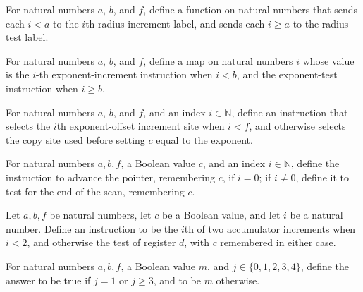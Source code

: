 \begin{definition}
\label{Complexity.PathHard.sSinc}
\leanok
{}
For natural numbers $a$, $b$, and $f$, define a function on natural numbers that sends
each $i<a$ to the $i$th radius-increment label, and sends each $i\ge a$ to the
radius-test label.
\end{definition}

\begin{definition}
\label{Complexity.PathHard.sEinc}
\leanok
{}
For natural numbers $a$, $b$, and $f$, define a map on natural numbers $i$ whose value
is the $i$-th exponent-increment instruction when $i<b$, and the exponent-test
instruction when $i\ge b$.
\end{definition}

\begin{definition}
\label{Complexity.PathHard.eInc}
\leanok
{}
For natural numbers $a$, $b$, and $f$, and an index $i\in\mathbb{N}$, define an
instruction that selects the $i$th exponent-offset increment site when $i<f$, and
otherwise selects the copy site used before setting $c$ equal to the exponent.
\end{definition}

\begin{definition}
\label{Complexity.PathHard.tAdv}
\leanok
{}
For natural numbers $a,b,f$, a Boolean value $c$, and an index $i\in\mathbb{N}$, define
the instruction to advance the pointer, remembering $c$, if $i=0$; if $i\ne0$, define it
to test for the end of the scan, remembering $c$.
\end{definition}

\begin{definition}
\label{Complexity.PathHard.dInc}
\leanok
{}
Let $a,b,f$ be natural numbers, let $c$ be a Boolean value, and let $i$ be a natural
number. Define an instruction to be the $i$th of two accumulator increments when $i<2$,
and otherwise the test of register $d$, with $c$ remembered in either case.
\end{definition}

\begin{definition}
\label{Complexity.PathHard.tailAns}
\leanok
For natural numbers $a,b,f$, a Boolean value $m$, and $j\in\{0,1,2,3,4\}$, define the
answer to be true if $j=1$ or $j\ge3$, and to be $m$ otherwise.
\end{definition}

